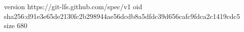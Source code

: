 version https://git-lfs.github.com/spec/v1
oid sha256:d91e3e65de2130fc2b298944ae56dcdb8a5dfdc39d656cafc9fdca2c1419cdc5
size 680

